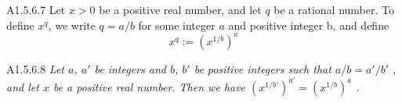 \begin{definition}{A1.5.6.7}
    Let $x > 0$ be a positive real number, and let $q$ be a rational number. To
    define $x^q$, we write $q=a/b$ for some integer $a$ and positive integer b,
    and define
    \begin{equation*}
        x^q := (x^{1/b})^a
    \end{equation*}
\end{definition}

\begin{lemma}{A1.5.6.8}
    \emph{Let $a$, $a'$ be integers and $b$, $b'$ be positive integers such that $a/b = a'/b'$
    , and let $x$ be a positive real number. Then we have $(x^{1/b'})^{a'} = (x^{1/b})^a$
    .}
\end{lemma}

